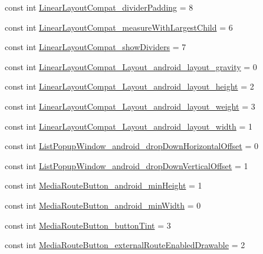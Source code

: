 \begin{CompactItemize}
\item 
const int \hyperlink{class__2doo_1_1_droid_1_1_resource_1_1_styleable_6b8085671d9aed2ed3b05f2df4437315}{LinearLayoutCompat\_\-dividerPadding} = 8
\item 
const int \hyperlink{class__2doo_1_1_droid_1_1_resource_1_1_styleable_5cfce0b16b7abde44c37f6ccc98f0dab}{LinearLayoutCompat\_\-measureWithLargestChild} = 6
\item 
const int \hyperlink{class__2doo_1_1_droid_1_1_resource_1_1_styleable_50213cd0c281406c15f29fd36f6f08ab}{LinearLayoutCompat\_\-showDividers} = 7
\item 
const int \hyperlink{class__2doo_1_1_droid_1_1_resource_1_1_styleable_9cd1a19d59632a6c4a1cb29044ec8a9e}{LinearLayoutCompat\_\-Layout\_\-android\_\-layout\_\-gravity} = 0
\item 
const int \hyperlink{class__2doo_1_1_droid_1_1_resource_1_1_styleable_485ea32e595190c644e48c2c9320bb0a}{LinearLayoutCompat\_\-Layout\_\-android\_\-layout\_\-height} = 2
\item 
const int \hyperlink{class__2doo_1_1_droid_1_1_resource_1_1_styleable_96ec8bc70e7af34db3d0a162ffc22e85}{LinearLayoutCompat\_\-Layout\_\-android\_\-layout\_\-weight} = 3
\item 
const int \hyperlink{class__2doo_1_1_droid_1_1_resource_1_1_styleable_7afb8836f726b08f6eb78dd31735921b}{LinearLayoutCompat\_\-Layout\_\-android\_\-layout\_\-width} = 1
\item 
const int \hyperlink{class__2doo_1_1_droid_1_1_resource_1_1_styleable_c6994e9c105afea86cb085ad83e54bd8}{ListPopupWindow\_\-android\_\-dropDownHorizontalOffset} = 0
\item 
const int \hyperlink{class__2doo_1_1_droid_1_1_resource_1_1_styleable_d4f5c7e5aed5b520770e5883af13782b}{ListPopupWindow\_\-android\_\-dropDownVerticalOffset} = 1
\item 
const int \hyperlink{class__2doo_1_1_droid_1_1_resource_1_1_styleable_b09aeb7ef7634cccfdd60ae029408119}{MediaRouteButton\_\-android\_\-minHeight} = 1
\item 
const int \hyperlink{class__2doo_1_1_droid_1_1_resource_1_1_styleable_d01de81504dae35b540ba880d401a6ba}{MediaRouteButton\_\-android\_\-minWidth} = 0
\item 
const int \hyperlink{class__2doo_1_1_droid_1_1_resource_1_1_styleable_9efe2d9b8cfe9870e3444d75bab5848d}{MediaRouteButton\_\-buttonTint} = 3
\item 
const int \hyperlink{class__2doo_1_1_droid_1_1_resource_1_1_styleable_547e5ea59b5351b64a7bdf0ff305f473}{MediaRouteButton\_\-externalRouteEnabledDrawable} = 2

\end{CompactItemize}
